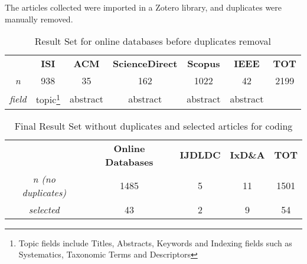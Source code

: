 The articles collected were imported in a Zotero library, and duplicates were manually removed.

\begin{savenotes}
\begin{table}[ht]
\setlength{\tabcolsep}{8pt}
\centering
\caption{Result Set for online databases before duplicates removal}
\label{table:result_1}
\begin{tabular}{cccccc|c}
 & \cellcolor[HTML]{EFEFEF}\textbf{ISI} & \cellcolor[HTML]{EFEFEF}\textbf{ACM} & \cellcolor[HTML]{EFEFEF}\textbf{ScienceDirect} & \cellcolor[HTML]{EFEFEF}\textbf{Scopus} & \cellcolor[HTML]{EFEFEF}\textbf{IEEE} & \textbf{TOT} \\
\textit{n} & 938 & 35 & 162 & 1022 & 42 & 2199 \\
\textit{field} & topic\footnote{Topic fields include Titles, Abstracts, Keywords and Indexing fields such as Systematics, Taxonomic Terms and Descriptors} & abstract & abstract & abstract & abstract & 
\end{tabular}
\end{table}
\end{savenotes}

\begin{table}[ht]
\setlength{\tabcolsep}{8pt}
\centering
\caption{Final Result Set without duplicates and selected articles for coding}
\label{table:result_2}
\begin{tabular}{cccc|c}
 & \cellcolor[HTML]{EFEFEF}\textbf{Online Databases} & \cellcolor[HTML]{EFEFEF}\textbf{IJDLDC} & \cellcolor[HTML]{EFEFEF}\textbf{IxD\&A} & \textbf{TOT} \\
\textit{n (no duplicates)} & 1485 & 5 & 11 & 1501 \\
\textit{selected} & 43 & 2 & 9 & 54
\end{tabular}
\end{table}